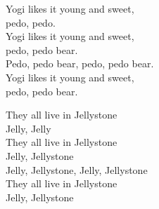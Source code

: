 Yogi likes it young and sweet,\\
pedo, pedo.\\
Yogi likes it young and sweet,\\
pedo, pedo bear.\\
Pedo, pedo bear, pedo, pedo bear.\\
Yogi likes it young and sweet,\\
pedo, pedo bear.

They all live in Jellystone\\
Jelly, Jelly\\
They all live in Jellystone\\
Jelly, Jellystone\\
Jelly, Jellystone, Jelly, Jellystone\\
They all live in Jellystone\\
Jelly, Jellystone